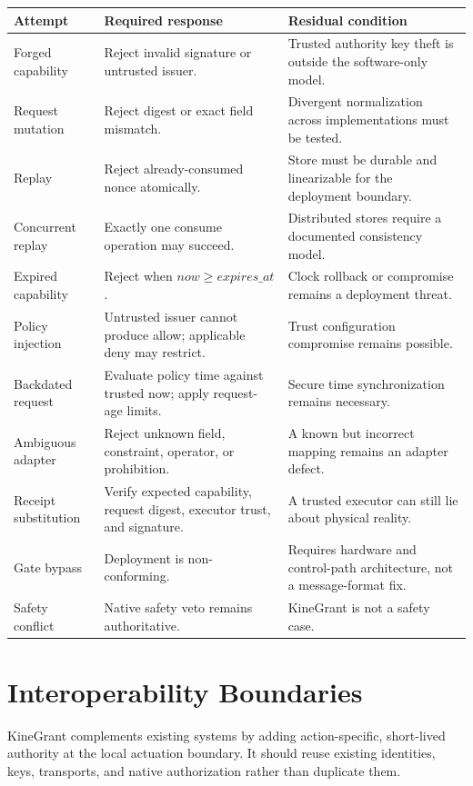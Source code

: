 \documentclass[10.5pt,a4paper]{article}
\begin{document}
\begin{longtable}{@{}p{34mm}p{57mm}p{62mm}@{}}
\toprule
\textbf{Attempt} & \textbf{Required response} & \textbf{Residual condition} \\
\midrule
\endhead
Forged capability & Reject invalid signature or untrusted issuer. & Trusted authority key theft
is outside the software-only model. \\
Request mutation & Reject digest or exact field mismatch. & Divergent normalization across
implementations must be tested. \\
Replay & Reject already-consumed nonce atomically. & Store must be durable and linearizable for
the deployment boundary. \\
Concurrent replay & Exactly one consume operation may succeed. & Distributed stores require a
documented consistency model. \\
Expired capability & Reject when $now\geq expires\_at$. & Clock rollback or compromise remains a
deployment threat. \\
Policy injection & Untrusted issuer cannot produce allow; applicable deny may restrict. & Trust
configuration compromise remains possible. \\
Backdated request & Evaluate policy time against trusted now; apply request-age limits. & Secure
time synchronization remains necessary. \\
Ambiguous adapter & Reject unknown field, constraint, operator, or prohibition. & A known but
incorrect mapping remains an adapter defect. \\
Receipt substitution & Verify expected capability, request digest, executor trust, and signature.
& A trusted executor can still lie about physical reality. \\
Gate bypass & Deployment is non-conforming. & Requires hardware and control-path architecture,
not a message-format fix. \\
Safety conflict & Native safety veto remains authoritative. & KineGrant is not a safety case. \\
\bottomrule
\end{longtable}

\section{Interoperability Boundaries}

KineGrant complements existing systems by adding action-specific, short-lived authority at the
local actuation boundary. It should reuse existing identities, keys, transports, and native
authorization rather than duplicate them.
\end{document}
